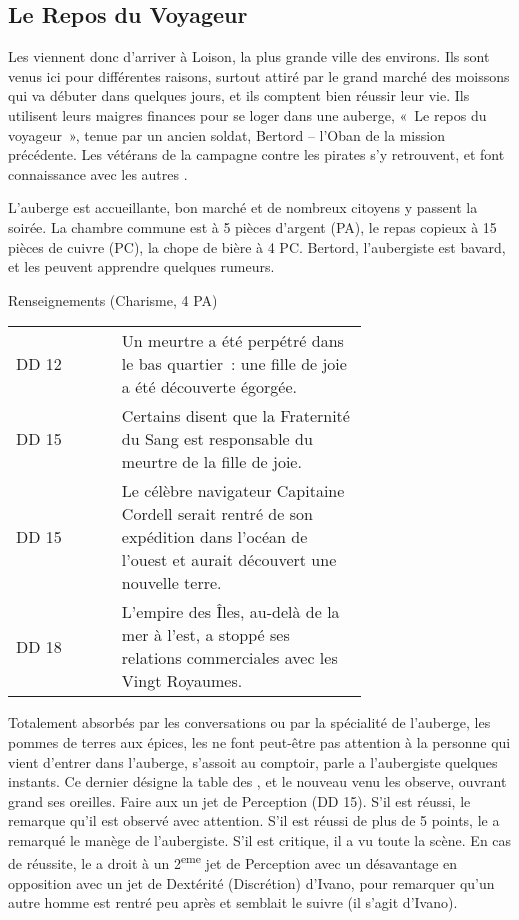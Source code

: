 \documentclass[a4paper,10pt,openany]{book}
\begin{document}
\begin{multicols}{2}
\subsection{Le Repos du Voyageur}
Les \PJs viennent donc d’arriver à Loison, la plus grande ville des environs. Ils sont venus ici pour différentes raisons, surtout attiré par le grand
marché des moissons qui va débuter dans quelques jours, et ils comptent bien réussir leur vie. Ils utilisent leurs maigres finances pour se loger dans
une auberge, « Le repos du voyageur », tenue par un ancien soldat, Bertord – l’Oban de la mission précédente. Les \PJs vétérans de la campagne contre
les pirates s’y retrouvent, et font connaissance avec les autres \PJs.\par L’auberge est accueillante, bon marché et de nombreux citoyens y passent la
soirée. La chambre commune est à 5 pièces d’argent (PA), le repas copieux à 15 pièces de cuivre (PC), la chope de bière à 4 PC. Bertord, l’aubergiste
est bavard, et les \PJs peuvent apprendre quelques rumeurs.

\begin{quotebox}
	Renseignements (Charisme, 4 PA)\par\noindent
	\begin{tabular}{lp{0.7\linewidth}}
		DD 12 & Un meurtre a été perpétré dans le bas quartier : une fille de joie a été découverte égorgée.\\
		DD 15 & Certains disent que la Fraternité du Sang est responsable du meurtre de la fille de joie.\\
		DD 15 & Le célèbre navigateur Capitaine Cordell serait rentré de son expédition dans l’océan de l’ouest et aurait découvert une nouvelle terre.\\
		DD 18 & L’empire des Îles, au-delà de la mer à l’est, a stoppé ses relations commerciales avec les Vingt Royaumes.
	\end{tabular}
\end{quotebox}

Totalement absorbés par les conversations ou par la spécialité de l’auberge, les pommes de terres aux épices, les \PJs ne font peut-être pas
attention à la personne qui vient d’entrer dans l’auberge, s’assoit au comptoir, parle a l’aubergiste quelques instants. Ce dernier désigne la table
des \PJs, et le nouveau venu les observe, ouvrant grand ses oreilles. Faire aux \PJs un jet de Perception (DD 15). S’il est réussi, le \PJ remarque
qu’il est observé avec attention. S’il est réussi de plus de 5 points, le \PJ a remarqué le manège de l’aubergiste. S’il  est critique, il a vu toute
la scène. En cas de réussite, le \PJ a droit à un 2\textsuperscript{eme} jet de Perception avec un désavantage en opposition avec un jet de Dextérité
(Discrétion) d’Ivano, pour remarquer qu’un autre homme est rentré peu après et semblait le suivre (il s’agit d’Ivano).


\end{multicols}
\end{document}
